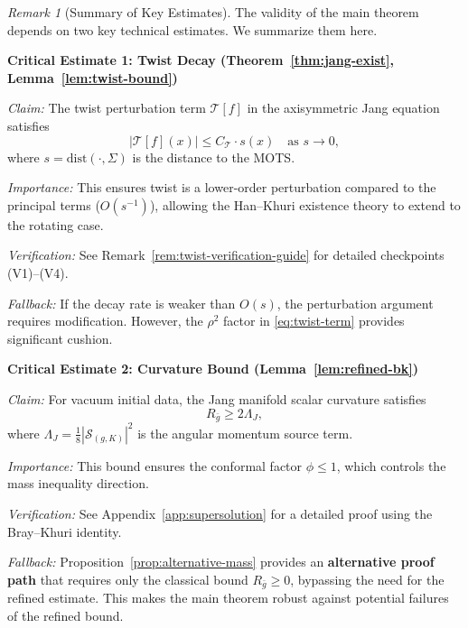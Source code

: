 \documentclass[12pt]{article}
\theoremstyle{plain}
\theoremstyle{definition}
\theoremstyle{remark}
\newtheorem{remark}[theorem]{Remark}
\newcommand{\bg}{\bar{g}}
\begin{document}
\begin{remark}[Summary of Key Estimates]
The validity of the main theorem depends on two key technical estimates. We summarize them here.

\medskip
\textbf{Critical Estimate 1: Twist Decay (Theorem~\ref{thm:jang-exist}, Lemma~\ref{lem:twist-bound})}

\textit{Claim:} The twist perturbation term $\mathcal{T}[f]$ in the axisymmetric Jang equation satisfies
\[
|\mathcal{T}[f](x)| \leq C_\mathcal{T} \cdot s(x) \quad \text{as } s \to 0,
\]
where $s = \mathrm{dist}(\cdot, \Sigma)$ is the distance to the MOTS.

\textit{Importance:} This ensures twist is a lower-order perturbation compared to the principal terms ($O(s^{-1})$), allowing the Han--Khuri existence theory to extend to the rotating case.

\textit{Verification:} See Remark~\ref{rem:twist-verification-guide} for detailed checkpoints (V1)--(V4).

\textit{Fallback:} If the decay rate is weaker than $O(s)$, the perturbation argument requires modification. However, the $\rho^2$ factor in \eqref{eq:twist-term} provides significant cushion.

\medskip
\textbf{Critical Estimate 2: Curvature Bound (Lemma~\ref{lem:refined-bk})}

\textit{Claim:} For vacuum initial data, the Jang manifold scalar curvature satisfies
\[
R_{\bg} \geq 2\Lambda_J,
\]
where $\Lambda_J = \frac{1}{8}|\mathcal{S}_{(g,K)}|^2$ is the angular momentum source term.

\textit{Importance:} This bound ensures the conformal factor $\phi \leq 1$, which controls the mass inequality direction.

\textit{Verification:} See Appendix~\ref{app:supersolution} for a detailed proof using the Bray--Khuri identity.

\textit{Fallback:} Proposition~\ref{prop:alternative-mass} provides an \textbf{alternative proof path} that requires only the classical bound $R_{\bg} \geq 0$, bypassing the need for the refined estimate. This makes the main theorem robust against potential failures of the refined bound.
\end{remark}
\end{document}
